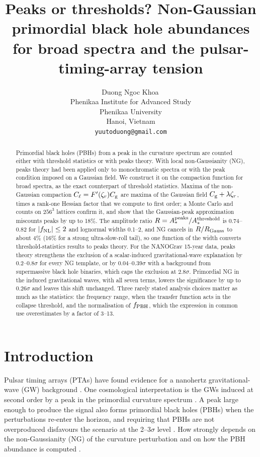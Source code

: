 \documentclass{article}
\title{Peaks or thresholds? Non-Gaussian primordial black hole abundances for broad spectra and the
pulsar-timing-array tension
}
\author{
  Duong Ngoc Khoa\,\orcidlink{0009-0009-9409-3298} \\
  Phenikaa Institute for Advanced Study \\
  Phenikaa University \\
  Hanoi, Vietnam \\
  \texttt{yuutoduong@gmail.com} \\
}
\newcommand{\Cg}{C_{\rm g}}
\newcommand{\Cl}{C_{\ell}}
\newcommand{\zr}{\zeta_r}
\newcommand{\fnl}{f_{\rm NL}}
\newcommand{\fpbh}{f_{\rm PBH}}
\begin{document}
\maketitle


\begin{abstract}
Primordial black holes (PBHs) from a peak in the curvature spectrum are counted either
with threshold statistics or with peaks theory. With local non-Gaussianity (NG), peaks theory had
been applied only to monochromatic spectra or with the peak condition imposed on a Gaussian field.
We construct it on the compaction function for broad spectra, as the exact counterpart of
threshold statistics. Maxima of the non-Gaussian compaction $\Cl=F'(\zr)\Cg$ are maxima of the
Gaussian field $\Cg+\lambda\zr$, times a rank-one Hessian factor that we compute to first order; a
Monte Carlo and counts on $256^3$ lattices confirm it, and show that the Gaussian-peak approximation
miscounts peaks by up to 18\%. The amplitude ratio
$R=A_*^{\rm peaks}/A_*^{\rm threshold}$ is 0.74--0.82 for $|\fnl|\le2$ and lognormal widths
0.1--2, and NG cancels in $R/R_{\rm Gauss}$ to about 4\% (16\% for a strong ultra-slow-roll tail),
so one function of the width converts threshold-statistics results to peaks theory. For the NANOGrav 15-year data, peaks theory
strengthens the exclusion of a scalar-induced gravitational-wave explanation by 0.2--0.8$\sigma$
for every NG template, or by 0.04--0.39$\sigma$ with a background from supermassive black hole
binaries, which caps the exclusion at $2.8\sigma$. Primordial NG in the induced gravitational
waves, with all seven terms, lowers the significance by up to $0.26\sigma$ and leaves this shift
unchanged. Three rarely stated analysis choices matter as much as the statistics: the frequency
range, when the transfer function acts in the collapse threshold, and the normalisation of
$\fpbh$, which the expression in common use overestimates by a factor of 3--13.
\end{abstract}




\section{Introduction}\label{sec:intro}

Pulsar timing arrays (PTAs) have found evidence for a nanohertz gravitational-wave (GW)
background \cite{NG15gwb,EPTA23,PPTA23,CPTA23}. One cosmological interpretation is the GWs
induced at second order by a peak in the primordial curvature spectrum
\cite{Ananda,Baumann,Kohri,Domenech,NG15np,FPRS23,Ellis23}. A peak large enough to produce the
signal also forms primordial black holes (PBHs) when the perturbations re-enter the horizon, and
requiring that PBHs are not overproduced disfavours the scenario at the 2--3$\sigma$ level
\cite{FIVT23,NG15np,Iovino24}. How strongly depends on the non-Gaussianity (NG) of the curvature
perturbation \cite{FIVT23,LCH23,WZLZ23} and on how the PBH abundance is computed \cite{Iovino24}.
\end{document}
